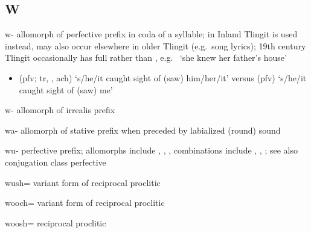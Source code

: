 \documentclass[12pt,letterpaper,oneside,article]{memoir}
\begin{document}
\subsection{W}\label{sec:alphalist-w}
\begin{morphdesc}[resume*=alphalist]
\item[w-]
	allomorph of  perfective prefix in coda of a syllable;
	in Inland Tlingit  is used instead, may also occur elsewhere in older Tlingit
		(e.g.\ song lyrics);
	19th century Tlingit occasionally has full  rather than ,
		e.g.\  ‘she knew her father’s house’
		\parencite[255.7]{swanton:1909}
	\begin{itemize}
	\item	{} (pfv; tr, , ach) ‘s/he/it caught sight of (saw) him/her/it’\newline
		versus  (pfv) ‘s/he/it caught sight of (saw) me’
	\end{itemize}

\item[w-]
	allomorph of  irrealis prefix

\item[wa-]
	allomorph of  stative prefix when preceded by labialized (round) sound

\item[wu-]
	perfective prefix;
	allomorphs include , , ,
	combinations include , , ;
	see also  conjugation class perfective 

\item[wush=]
	variant form of  reciprocal proclitic

\item[wooch=]
	variant form of  reciprocal proclitic

\item[woosh=]
	reciprocal proclitic
\end{morphdesc}
\end{document}
